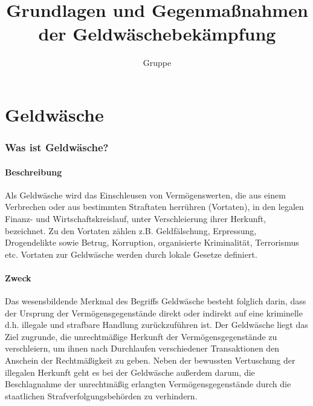 \documentclass{article}
\begin{document}
\title{Grundlagen und Gegenmaßnahmen der Geldwäschebekämpfung}
\author{Gruppe}
\maketitle

\tableofcontents


\newpage

\part[Geldwäsche]{Geldwäsche}

    \section[Was ist Geldwäsche?]{Was ist Geldwäsche?}
            
        \subsection[Beschreibung]{Beschreibung}

            Als Geldwäsche wird das Einschleusen von Vermögenswerten, die aus einem Verbrechen oder aus bestimmten Straftaten herrühren (Vortaten), in den legalen Finanz- und Wirtschaftskreislauf, unter Verschleierung ihrer Herkunft, bezeichnet. Zu den Vortaten zählen z.B. Geldfälschung, Erpressung, Drogendelikte sowie Betrug, Korruption, organisierte Kriminalität, Terrorismus etc. Vortaten zur Geldwäsche werden durch lokale Gesetze definiert.
        
        \subsection[Zweck]{Zweck}

            Das wesensbildende Merkmal des Begriffs Geldwäsche besteht folglich darin, dass der Ursprung der Vermögensgegenstände direkt oder indirekt auf eine kriminelle d.h. illegale und strafbare Handlung zurückzuführen ist.
            Der Geldwäsche liegt das Ziel zugrunde, die unrechtmäßige Herkunft der Vermögensgegenstände zu verschleiern, um ihnen nach Durchlaufen verschiedener Transaktionen den Anschein der Rechtmäßigkeit zu geben. 
            Neben der bewussten Vertuschung der illegalen Herkunft geht es bei der Geldwäsche außerdem darum, die Beschlagnahme der unrechtmäßig erlangten Vermögensgegenstände durch die staatlichen Strafverfolgungsbehörden zu verhindern.
\end{document}
